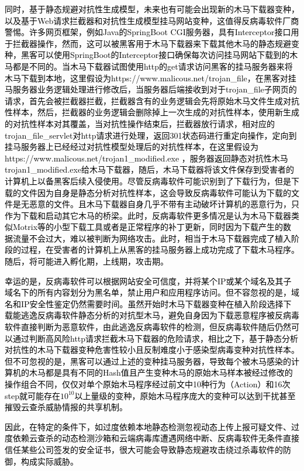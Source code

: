 \textcolor{black}{同时，基于静态规避对抗性生成模型，未来也有可能会出现新的木马下载器变种，以及基于Web请求拦截器和对抗性生成模型挂马网站变种，这值得反病毒软件厂商警惕。许多网页框架，例如Java的SpringBoot CGI服务器，具有Interceptor接口用于拦截器操作，然而，这可以被黑客用于木马下载器来下载其他木马的静态规避变种，黑客可以使用SpringBoot的Interceptor接口确保每次访问挂马网站下载到的木马都是不同的。当木马下载器试图使用http的get请求访问黑客的挂马服务器来将木马下载到本地，这里假设为https://www.malicous.net/trojan\_file，在黑客对挂马服务器业务逻辑处理进行修改后，当服务器后端接收到对于trojan\_file子网页的请求，首先会被拦截器拦截，拦截器含有的业务逻辑会先将原始木马文件生成对抗性样本，然后，拦截器的业务逻辑会删除掉上一次生成的对抗性样本，使用新生成的对抗性样本对其覆盖，当对抗性操作结束后，拦截器放行请求，相对应的trojan\_file\_servlet对http请求进行处理，返回301状态码进行重定向操作，定向到挂马服务器上已经经过对抗性模型处理后的对抗性样本，在这里假设为https://www.malicous.net/trojan1\_modified.exe ，服务器返回静态对抗性木马trojan1\_modified.exe给木马下载器，随后，木马下载器将该文件保存到受害者的计算机上以备黑客后续入侵使用。尽管反病毒软件可能识别到了下载行为，但是下载的文件因为自身是静态分析对抗性样本，这会导致反病毒软件可能认为下载的文件是无恶意的文件。且木马下载器自身几乎不带有主动破坏计算机的恶意行为，只作为下载和启动其它木马的桥梁。此时，反病毒软件更多情况是认为木马下载器类似Motrix等的小型下载工具或者是正常程序的补丁更新，同时因为下载产生的数据流量不会过大，难以被判断为网络攻击。此时，相当于木马下载器完成了植入阶段的过程，在受害者的计算机上从黑客的挂马服务器上成功完成了下载木马程序。随后，将可能进入孵化期，上线期，攻击期\cite{ref41}。}

\textcolor{black}{幸运的是，反病毒软件可以根据网站安全可信度，并将某个IP或某个域名及其子域名下的所有内容划分为黑名单，禁止用户和应用程序访问。但不容忽视的是，域名和IP安全性鉴定仍然需要时间。虽然开始时木马下载器变种在植入阶段选择下载能逃逸反病毒软件静态分析的对抗型木马，避免自身因为下载恶意程序被反病毒软件直接判断为恶意软件，由此逃逸反病毒软件的检测，但反病毒软件随后仍然可以通过判断高风险http请求拦截木马下载器的危险请求，相比之下，基于静态分析对抗性的木马下载器变种危害性较小且反制难度小于感染型病毒变种对抗性样本。但不可忽视的是，黑客可以通过上述的变种挂马服务器，导致每个被木马感染的计算机的木马都是具有不同的Hash值且产生变种木马的原始木马样本被经过修改的操作组合不同，仅仅对单个原始木马程序经过前文中10种行为（Action）和16次step就可能存在$10^{10}$以上量级的变种，原始木马程序庞大的变种可以达到干扰甚至摧毁云查杀威胁情报的共享机制。}

\textcolor{black}{因此，在特定的条件下，如过度依赖本地静态检测忽视动态上传上报可疑文件、过度依赖云查杀的动态检测沙箱和云端病毒库遭遇网络中断、反病毒软件无条件直接信任某些公司签发的安全证书，很大可能会导致静态规避攻击绕过杀毒软件的防御，构成实际威胁。}

